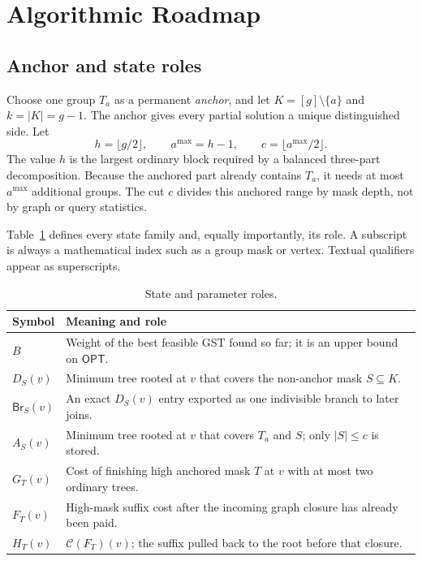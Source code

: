\documentclass[sigconf,nonacm]{acmart}
\newcommand{\Clos}{\mathcal{C}}
\newcommand{\Br}{\mathsf{Br}}
\newcommand{\OPT}{\mathsf{OPT}}
\begin{document}
\section{Algorithmic Roadmap}
\label{sec:roadmap}

\subsection{Anchor and state roles}

Choose one group $T_a$ as a permanent \emph{anchor}, and let $K=[g]\setminus\{a\}$ and $k=|K|=g-1$.  The anchor gives every partial solution a unique distinguished side.  Let
\[
 h=\lfloor g/2\rfloor,\qquad a^{\max}=h-1,\qquad
 c=\lfloor a^{\max}/2\rfloor.
\]
The value $h$ is the largest ordinary block required by a balanced three-part decomposition.  Because the anchored part already contains $T_a$, it needs at most $a^{\max}$ additional groups.  The cut $c$ divides this anchored range by mask depth, not by graph or query statistics.

Table~\ref{tab:states} defines every state family and, equally importantly, its role.  A subscript is always a mathematical index such as a group mask or vertex.  Textual qualifiers appear as superscripts.
\begin{table}[t]
\centering
\footnotesize
\caption{State and parameter roles.}
\label{tab:states}
\begin{tabular}{@{}p{}p{}@{}}
\toprule
Symbol & Meaning and role \\
\midrule
$B$ & Weight of the best feasible GST found so far; it is an upper bound on $\OPT$. \\
$D_S(v)$ & Minimum tree rooted at $v$ that covers the non-anchor mask $S\subseteq K$. \\
$\Br_S(v)$ & An exact $D_S(v)$ entry exported as one indivisible branch to later joins. \\
$A_S(v)$ & Minimum tree rooted at $v$ that covers $T_a$ and $S$; only $|S|\leq c$ is stored. \\
$G_T(v)$ & Cost of finishing high anchored mask $T$ at $v$ with at most two ordinary trees. \\
$F_T(v)$ & High-mask suffix cost after the incoming graph closure has already been paid. \\
$H_T(v)$ & $\Clos(F_T)(v)$; the suffix pulled back to the root before that closure. \\
\bottomrule
\end{tabular}
\end{table}
\end{document}
